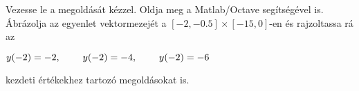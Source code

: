 Vezesse le a
\de{} megoldását kézzel.
Oldja meg a Matlab/Octave   segítségével is.
Ábrázolja az egyenlet vektormezejét a $[-2,-0.5]\times [-15,0]$-en és rajzoltassa rá
az
\centerline{$y(-2)=-2, \hspace{0.8cm} y(-2)=-4, \hspace{0.8cm} y(-2)=-6$}
kezdeti értékekhez tartozó megoldásokat is.


